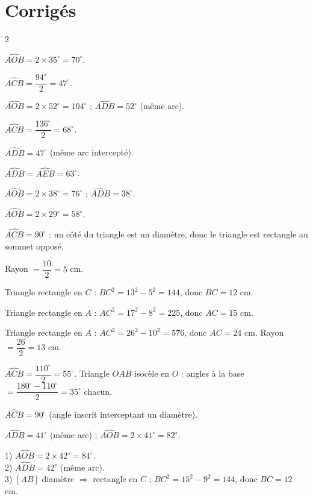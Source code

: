 \section{Corrigés}
\begin{multicols}{2}

$\widehat{AOB}=2\times35^{\circ}=70^{\circ}$.

$\widehat{ACB}=\dfrac{94^{\circ}}2=47^{\circ}$.

$\widehat{AOB}=2\times52^{\circ}=104^{\circ}$ ; $\widehat{ADB}=52^{\circ}$ (même arc).

$\widehat{ACB}=\dfrac{136^{\circ}}2=68^{\circ}$.

$\widehat{ADB}=47^{\circ}$ (même arc intercepté).

$\widehat{ADB}=\widehat{AEB}=63^{\circ}$.

$\widehat{AOB}=2\times38^{\circ}=76^{\circ}$ ; $\widehat{ADB}=38^{\circ}$.

$\widehat{AOB}=2\times29^{\circ}=58^{\circ}$.

$\widehat{ACB}=90^{\circ}$ : un côté du triangle est un diamètre, donc le triangle est
rectangle au sommet opposé.

Rayon $=\dfrac{10}2=5$ cm.

Triangle rectangle en $C$ : $BC^{2}=13^{2}-5^{2}=144$, donc $BC=12$ cm.

Triangle rectangle en $A$ : $AC^{2}=17^{2}-8^{2}=225$, donc $AC=15$ cm.

Triangle rectangle en $A$ : $AC^{2}=26^{2}-10^{2}=576$, donc $AC=24$ cm. Rayon
$=\dfrac{26}2=13$ cm.

$\widehat{ACB}=\dfrac{110^{\circ}}2=55^{\circ}$. Triangle $OAB$ isocèle en $O$ : angles à
la base $=\dfrac{180^{\circ}-110^{\circ}}2=35^{\circ}$ chacun.

$\widehat{ACB}=90^{\circ}$ (angle inscrit interceptant un diamètre).

$\widehat{ADB}=41^{\circ}$ (même arc) ; $\widehat{AOB}=2\times41^{\circ}=82^{\circ}$.

1) $\widehat{AOB}=2\times42^{\circ}=84^{\circ}$.\\
2) $\widehat{ADB}=42^{\circ}$ (même arc).\\
3) $[AB]$ diamètre $\Rightarrow$ rectangle en $C$ ; $BC^{2}=15^{2}-9^{2}=144$, donc
$BC=12$ cm.


\end{multicols}
